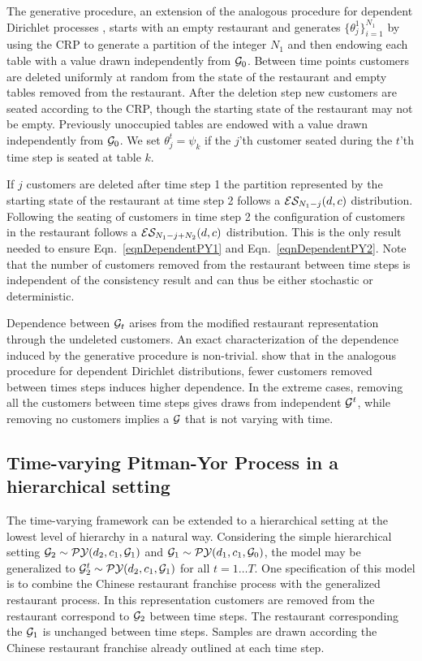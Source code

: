The generative procedure, an extension of the analogous procedure for dependent Dirichlet processes \cite{caron}, starts with an empty restaurant and generates $\{ \theta_j^1\}_{i = 1}^{N_1}$ by using the CRP to generate a partition of the integer $N_1$ and then endowing each table with a value drawn independently from $\G_0$.  Between time points customers are deleted uniformly at random from the state of the restaurant and empty tables removed from the restaurant.  After the deletion step new customers are seated according to the CRP, though the starting state of the restaurant may not be empty.  Previously unoccupied tables are endowed with a value drawn independently from $\G_0$.  We set $\theta^t_j = \psi_k$ if  the $j$'th customer seated during the $t$'th time step is seated at table $k$.

If $j$ customers are deleted after time step 1 the partition represented by the starting state of the restaurant at time step 2 follows a $\ES_{N_1- j}(d,c)$ distribution.  Following the seating of customers in time step 2 the configuration of customers in the restaurant follows a $\ES_{N_1 - j + N_2}(d,c)$ distribution.  This is the only result needed to ensure Eqn.~\ref{eqnDependentPY1} and Eqn.~\ref{eqnDependentPY2}.  Note that the number of customers removed from the restaurant between time steps is independent of the consistency result and can thus be either stochastic or deterministic.

Dependence between $\G_t$ arises from the modified restaurant representation through the undeleted customers.  An exact characterization of the dependence induced by the generative procedure is non-trivial.   \cite{caron} show that in the analogous procedure for dependent Dirichlet distributions, fewer customers removed between times steps induces higher dependence.  In the extreme cases, removing all the customers between time steps gives draws from independent $\G^t$, while removing no customers implies a $\G$ that is not varying with time. 

\subsection{Time-varying Pitman-Yor Process in a hierarchical setting}

The time-varying framework can be extended to a hierarchical setting at the lowest level of hierarchy in a natural way.  Considering the simple hierarchical setting $\G_2 \sim \PY(d_2, c_1, \G_1)$ and $\G_1 \sim \PY(d_1, c_1, \G_0)$, the model may be generalized to $\G^t_2 \sim  \PY(d_2, c_1, \G_1)$ for all $t  = 1 \dots T$.  One specification of this model is to combine the Chinese restaurant franchise process with the generalized restaurant process.  In this representation customers are removed from the restaurant correspond to $\G_2$ between time steps.  The restaurant corresponding the $\G_1$ is unchanged between time steps. Samples are drawn according the Chinese restaurant franchise already outlined at each time step.

